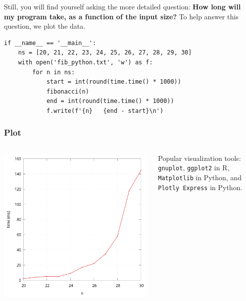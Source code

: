 \documentclass[aspectratio=169, 14pt]{beamer}
\begin{document}
\begin{frame}[fragile]

Still, you will find yourself asking the more detailed question: \textbf{How long will my program take, as a function of the input size?} To help answer this question, we plot the data. 

\begin{verbatim}
if __name__ == '__main__':
    ns = [20, 21, 22, 23, 24, 25, 26, 27, 28, 29, 30]
    with open('fib_python.txt', 'w') as f:
        for n in ns:
            start = int(round(time.time() * 1000))
            fibonacci(n)
            end = int(round(time.time() * 1000))
            f.write(f'{n}   {end - start}\n')
\end{verbatim}

\end{frame}

\begin{frame}
    \frametitle{Plot}
\begin{columns}
    \begin{center}
        \includegraphics[height=.8\paperheight]{week2/fib_python}    
    \end{center}
    Popular visualization tools:  \texttt{gnuplot}, \texttt{ggplot2} in R, \texttt{Matplotlib} in Python, and \texttt{Plotly Express} in Python.

\end{columns}
\end{frame}
\end{document}
